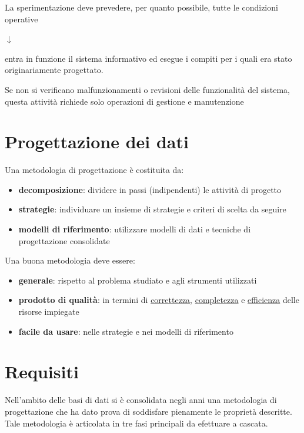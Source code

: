 \documentclass[12pt, a4paper, oneside]{book}
\begin{document}
\begin{description}
      La sperimentazione deve prevedere, per quanto possibile, tutte le condizioni operative
      \smallskip
      \item $\downarrow$
      \smallskip
      \item [\textcolor{azzurrino}{funzionamento}]
      \item entra in funzione il sistema informativo ed esegue i compiti per i quali era stato originariamente progettato.
      
      Se non si verificano malfunzionamenti o revisioni delle funzionalità del sistema, questa attività richiede solo operazioni di gestione e manutenzione
    \end{description}

    \section{Progettazione dei dati}
    Una metodologia di progettazione è costituita da:
    \begin{itemize}[label=$\triangleright$]
      \item \textbf{decomposizione}: dividere in passi (indipendenti) le attività di progetto
      \smallskip
      \item \textbf{strategie}: individuare un insieme di strategie e criteri di scelta da seguire
      \smallskip
      \item \textbf{modelli di riferimento}: utilizzare modelli di dati e tecniche di progettazione consolidate
    \end{itemize}

    Una buona metodologia deve essere:
    \begin{itemize}
      \item \textcolor{azzurrino}{\textbf{generale}}: rispetto al problema studiato e agli strumenti utilizzati
      \smallskip
      \item \textcolor{azzurrino}{\textbf{prodotto di qualità}}: in termini di \underline{correttezza}, \underline{completezza} e \underline{efficienza} delle risorse impiegate
      \smallskip
      \item \textcolor{azzurrino}{\textbf{facile da usare}}: nelle strategie e nei modelli di riferimento
    \end{itemize}

    \section{Requisiti}
    Nell'ambito delle basi di dati si è consolidata negli anni una metodologia di progettazione che ha dato prova di soddisfare pienamente le proprietà descritte.\\[0.2ex]
    Tale metodologia è articolata in tre fasi principali da efettuare a cascata.
\end{document}
